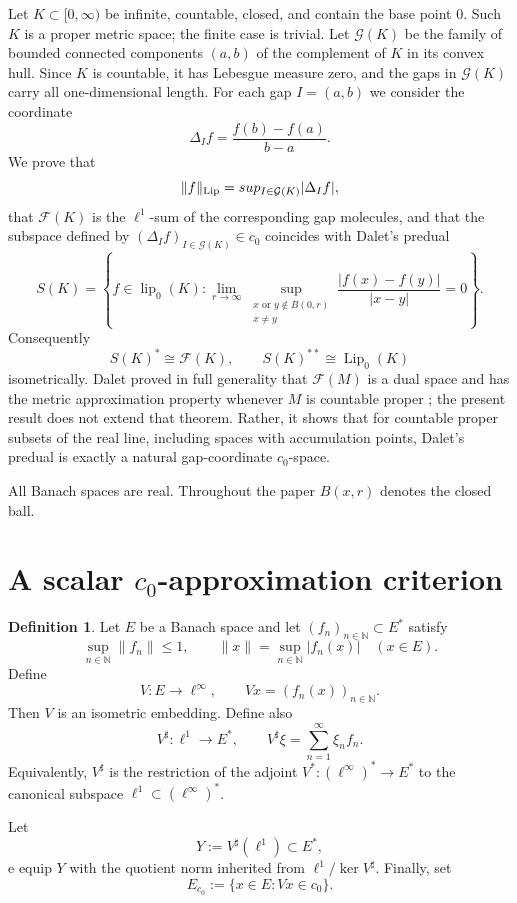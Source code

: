 \documentclass[11pt]{amsart}
\theoremstyle{plain}
\theoremstyle{definition}
\newtheorem{definition}[theorem]{Definition}
\theoremstyle{remark}
\newcommand{\Lip}{\operatorname{Lip}}
\newcommand{\lip}{\operatorname{lip}}
\newcommand{\F}{\mathcal F}
\newcommand{\N}{\mathbb N}
\begin{document}
Let $K\subset [0,\infty)$ be infinite, countable, closed, and contain the base point
$0$. Such $K$ is a proper metric space; the finite case is trivial. Let $\mathcal G(K)$ be the family of
bounded connected components $(a,b)$ of the complement of $K$ in its convex
hull. Since $K$ is countable, it has Lebesgue measure zero, and the gaps in
$\mathcal G(K)$ carry all one-dimensional length. For each gap $I=(a,b)$ we
consider the coordinate
\[
        \Delta_I f=\frac{f(b)-f(a)}{b-a}.
\]
We prove that
\[
        \|f\|_{\Lip}=\\sup_{I\in\mathcal G(K)} |\Delta_I f|,
\]
that $\F(K)$ is the $\ell^1$-sum of the corresponding gap molecules, and
that the subspace defined by $(\Delta_I f)_{I\in\mathcal G(K)}\in c_0$
coincides with Dalet's predual
\[
        S(K)=\left\{ f\in\lip_0(K):
        \lim_{r\to\infty}
        \sup_{\substack{x\text{ or }y\notin B(0,r)\\ x\ne y}}
        \frac{|f(x)-f(y)|}{|x-y|}=0
        \right\}.
\]
Consequently
\[
        S(K)^*\cong \F(K),\qquad S(K)^{**}\cong \Lip_0(K)
\]
isometrically. Dalet proved in full generality that $\F(M)$ is a dual space
and has the metric approximation property whenever $M$ is countable proper
\cite{Dal15b}; the present result does not extend that theorem. Rather, it
shows that for countable proper subsets of the real line, including spaces
with accumulation points, Dalet's predual is exactly a natural gap-coordinate
$c_0$-space.

All Banach spaces are real. Throughout the paper $B(x,r)$ denotes the
closed ball.

\section{\texorpdfstring{A scalar $c_0$-approximation criterion}{A scalar c0-approximation criterion}}

\begin{definition}\label{def:scalar-setting}
Let $E$ be a Banach space and let $(f_n)_{n\in\N}\subset E^*$ satisfy
\[
        \sup_{n\in\N}\|f_n\|\le 1,
        \qquad
        \|x\|=\sup_{n\in\N}|f_n(x)|\quad (x\in E).
\]
Define
\[
        V:E\longrightarrow \ell^\infty,
        \qquad
        Vx=(f_n(x))_{n\in\N}.
\]
Then $V$ is an isometric embedding. Define also
\[
        V^\sharp:\ell^1\longrightarrow E^*,
        \qquad
        V^\sharp\xi=\sum_{n=1}^\infty \xi_n f_n.
\]
Equivalently, $V^\sharp$ is the restriction of the adjoint
$V^*:(\ell^\infty)^*\to E^*$ to the canonical subspace
$\ell^1\subset (\ell^\infty)^*$.

Let
\[
        Y:=V^\sharp(\ell^1)\subset E^*,
\]
e equip $Y$ with the quotient norm inherited from $\ell^1/\ker V^\sharp$.
Finally, set
\[
        E_{c_0}:=\{x\in E:Vx\in c_0\}.
\]
\end{definition}
\end{document}
